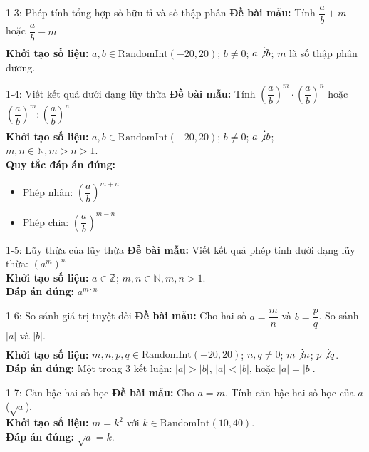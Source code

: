 \documentclass[11pt, a4paper]{article}
\begin{document}
\begin{qbox}{1-3: Phép tính tổng hợp số hữu tỉ và số thập phân}
\textbf{Đề bài mẫu:} Tính $\dfrac{a}{b} + m$ hoặc $\dfrac{a}{b} - m$ \\[0.3em]
\textbf{Khởi tạo số liệu:} $a, b \in \text{RandomInt}(-20, 20)$; $b \neq 0$; $a \not\vdots b$; $m$ là số thập phân dương.
\end{qbox}

\begin{qbox}{1-4: Viết kết quả dưới dạng lũy thừa}
\textbf{Đề bài mẫu:} Tính $\left(\dfrac{a}{b}\right)^m \cdot \left(\dfrac{a}{b}\right)^n$ hoặc $\left(\dfrac{a}{b}\right)^m : \left(\dfrac{a}{b}\right)^n$ \\[0.3em]
\textbf{Khởi tạo số liệu:} $a, b \in \text{RandomInt}(-20, 20)$; $b \neq 0$; $a \not\vdots b$; $m, n \in \mathbb{N}, m > n > 1$. \\[0.3em]
\textbf{Quy tắc đáp án đúng:}
\begin{itemize}[leftmargin=1.5em, topsep=2pt, itemsep=2pt]
    \item Phép nhân: $\left(\dfrac{a}{b}\right)^{m+n}$
    \item Phép chia: $\left(\dfrac{a}{b}\right)^{m-n}$
\end{itemize}
\end{qbox}

\begin{qbox}{1-5: Lũy thừa của lũy thừa}
\textbf{Đề bài mẫu:} Viết kết quả phép tính dưới dạng lũy thừa: $\left(a^m\right)^n$ \\[0.3em]
\textbf{Khởi tạo số liệu:} $a \in \mathbb{Z}$; $m, n \in \mathbb{N}, m, n > 1$. \\[0.3em]
\textbf{Đáp án đúng:} $a^{m \cdot n}$
\end{qbox}

\begin{qbox}{1-6: So sánh giá trị tuyệt đối}
\textbf{Đề bài mẫu:} Cho hai số $a = \dfrac{m}{n}$ và $b = \dfrac{p}{q}$. So sánh $|a|$ và $|b|$. \\[0.3em]
\textbf{Khởi tạo số liệu:} $m, n, p, q \in \text{RandomInt}(-20, 20)$; $n, q \neq 0$; $m \not\vdots n$; $p \not\vdots q$. \\[0.3em]
\textbf{Đáp án đúng:} Một trong 3 kết luận: $|a| > |b|$, $|a| < |b|$, hoặc $|a| = |b|$.
\end{qbox}

\begin{qbox}{1-7: Căn bậc hai số học}
\textbf{Đề bài mẫu:} Cho $a = m$. Tính căn bậc hai số học của $a$ ($\sqrt{a}$). \\[0.3em]
\textbf{Khởi tạo số liệu:} $m = k^2$ với $k \in \text{RandomInt}(10, 40)$. \\[0.3em]
\textbf{Đáp án đúng:} $\sqrt{a} = k$.
\end{qbox}
\end{document}
